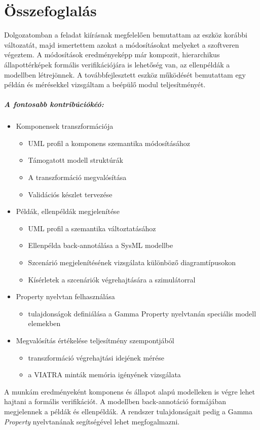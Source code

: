 \chapter{Összefoglalás}

Dolgozatomban a feladat kiírásnak megfelelően bemutattam az eszköz korábbi változatát, majd ismertettem azokat a módosításokat melyeket a szoftveren végeztem. A módosítások eredményeképp már kompozit, hierarchikus állapottérképek formális verifikációjára is lehetőség van, az ellenpéldák a modellben létrejönnek. A továbbfejlesztett eszköz működését bemutattam egy példán és mérésekkel vizsgáltam a beépülő modul teljesítményét.

\paragraph{A fontosabb kontribúciókéó:}
\begin{itemize}
	\item Komponensek transzformációja
		\begin{itemize}
			\item UML profil a komponens szemantika módosításához
			\item Támogatott modell struktúrák
			\item A transzformáció megvalósítása
			\item Validációs készlet tervezése
		\end{itemize}
	
	\item Példák, ellenpéldák megjelenítése
		\begin{itemize}
			\item UML profil a szemantika változtatásához
			\item Ellenpélda back-annotálása a SysML modellbe
			\item Szcenárió megjelenítésének vizsgálata különböző diagramtípusokon
			\item Kísérletek a szcenáriók végrehajtására a szimulátorral
		\end{itemize}
	\item Property nyelvtan felhasználása
		\begin{itemize}
			\item tulajdonságok definiálása a Gamma Property nyelvtanán speciális modell elemekben	
		\end{itemize}
	\item Megvalósítás értékelése teljesítmény szempontjából
		\begin{itemize}
			\item transzformáció végrehajtási idejének mérése
			\item a VIATRA minták memória igényének vizsgálata	
		\end{itemize}
\end{itemize}
A munkám eredményeként komponens és állapot alapú modelleken is végre lehet hajtani a formális verifikációt. A modellben back-annotáció formájában megjelennek a példák és ellenpéldák. A rendszer tulajdonságait pedig a Gamma \emph{Property} nyelvtanának segítségével lehet megfogalmazni.

